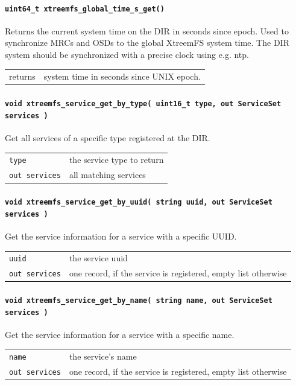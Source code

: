 \paragraph{\texttt{uint64\_t xtreemfs\_global\_time\_s\_get()}}
Returns the current system time on the DIR in seconds since epoch. Used to synchronize MRCs and OSDs to the global XtreemFS system time. The DIR system should be synchronized with a precise clock using e.g. ntp.

\begin{tabularx}{\textwidth}{lX}
 returns & system time in seconds since UNIX epoch.
\end{tabularx}


\paragraph{\texttt{void xtreemfs\_service\_get\_by\_type( uint16\_t type, out ServiceSet services~)}}
Get all services of a specific type registered at the DIR.

\begin{tabularx}{\textwidth}{lX}
 \texttt{type} & the service type to return\\
 \texttt{out services} & all matching services\\
\end{tabularx}


\paragraph{\texttt{void xtreemfs\_service\_get\_by\_uuid( string uuid, out ServiceSet services~)}}
Get the service information for a service with a specific UUID.

\begin{tabularx}{\textwidth}{lX}
 \texttt{uuid} & the service uuid\\
 \texttt{out services} & one record, if the service is registered, empty list otherwise\\
\end{tabularx}


\paragraph{\texttt{void xtreemfs\_service\_get\_by\_name( string name, out ServiceSet services~)}}
Get the service information for a service with a specific name.

\begin{tabularx}{\textwidth}{lX}
 \texttt{name} & the service's name\\
 \texttt{out services} & one record, if the service is registered, empty list otherwise\\
\end{tabularx}



